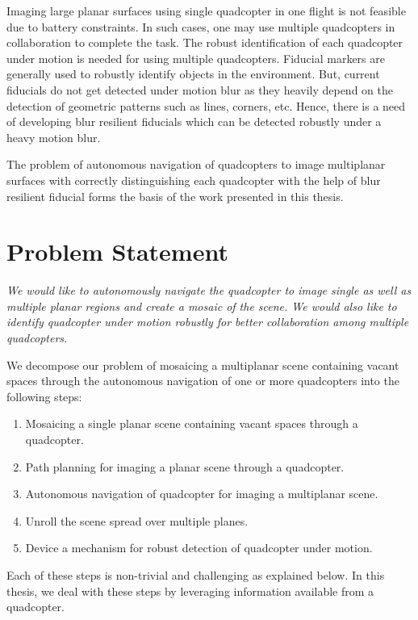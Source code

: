Imaging large planar surfaces using single quadcopter in one flight is not
feasible due to battery constraints. In such cases, one may use multiple
quadcopters in collaboration to complete the task. The robust identification of
each quadcopter under motion is needed for using multiple quadcopters. Fiducial
markers are generally used to robustly identify objects in the environment. But,
current fiducials do not get detected under motion blur as they heavily depend on the
detection of geometric patterns such as lines, corners, etc. Hence, there is a
need of developing blur resilient fiducials which can be detected robustly under
a heavy motion blur.

The problem of autonomous navigation of quadcopters to image multiplanar
surfaces with correctly distinguishing each quadcopter with the help of blur
resilient fiducial forms the basis of the work presented in this thesis.\\

\section{Problem Statement}
\textit{We would like to autonomously navigate the quadcopter to image
single as well as multiple planar regions and create a mosaic of the 
scene. We would also like to identify quadcopter under motion robustly for
better collaboration among multiple quadcopters.} 

We decompose our problem of mosaicing a multiplanar scene containing
vacant spaces through the autonomous navigation of one or more quadcopters
into the following steps:
\begin{enumerate}
  \item Mosaicing a single planar scene containing vacant spaces through
  a quadcopter.
  \item Path planning for imaging a planar scene through a quadcopter.
  \item Autonomous navigation of quadcopter for imaging a multiplanar scene.
  \item Unroll the scene spread over multiple planes.
  \item Device a mechanism for robust detection of quadcopter under motion. 
\end{enumerate}
Each of these steps is non-trivial and challenging as explained below. In this
thesis, we deal with these steps by leveraging information available from a quadcopter.  

